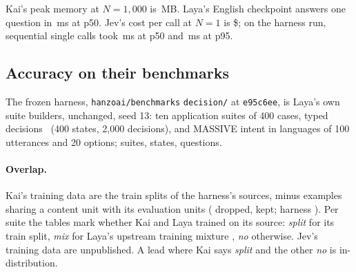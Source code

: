 Kai's peak memory at $N = 1{,}000$ is \,MB.
Laya's English checkpoint answers one question in
\,ms at p50. Jev's cost per call at
$N = 1$ is \$; on the harness run,
 sequential single calls took \,ms at p50 and
\,ms at p95.

\subsection{Accuracy on their benchmarks}
\label{sec:accuracy}

The frozen harness, \texttt{hanzoai/benchmarks} \texttt{decision/} at
\texttt{e95c6ee}, is Laya's own suite builders, unchanged, seed 13: ten
application suites of 400 cases, typed decisions~\cite{typeddecisions} (400
states, 2{,}000 decisions), and MASSIVE intent in 
languages of 100 utterances and 20 options;  suites,
 states,  questions.

\paragraph{Overlap.}
Kai's training data are the train splits of the harness's sources, minus
examples sharing a content unit with its  evaluation units
( dropped,  kept; harness
). Per suite the tables mark whether Kai and Laya trained
on its source:
\emph{split} for its train split, \emph{mix} for Laya's upstream training
mixture \reported, \emph{no} otherwise. Jev's training data are unpublished.
A lead where Kai says \emph{split} and the other \emph{no} is
in-distribution.

